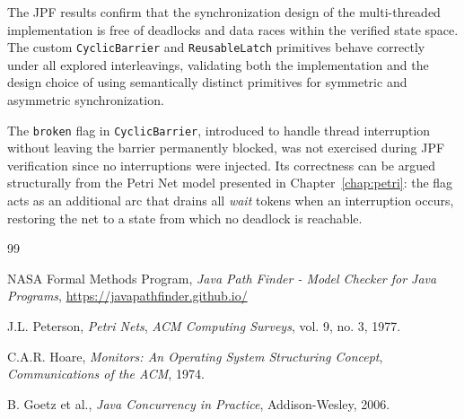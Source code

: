\documentclass[12pt,a4paper]{article}
\begin{document}
The JPF results confirm that the synchronization design of the
multi-threaded implementation is free of deadlocks and data races within
the verified state space. The custom \texttt{CyclicBarrier} and
\texttt{ReusableLatch} primitives behave correctly under all explored
interleavings, validating both the implementation and the design choice
of using semantically distinct primitives for symmetric and asymmetric
synchronization.
 
The \texttt{broken} flag in \texttt{CyclicBarrier}, introduced to handle
thread interruption without leaving the barrier permanently blocked, was
not exercised during JPF verification since no interruptions were injected.
Its correctness can be argued structurally from the Petri Net model
presented in Chapter~\ref{chap:petri}: the flag acts as an additional
arc that drains all \textit{wait} tokens when an interruption occurs,
restoring the net to a state from which no deadlock is reachable.

\begin{thebibliography}{99}

 NASA Formal Methods Program, \textit{Java Path Finder - Model Checker for Java Programs}, \url{https://javapathfinder.github.io/}

 J.L. Peterson, \textit{Petri Nets}, \textit{ACM Computing Surveys}, vol. 9, no. 3, 1977.

 C.A.R. Hoare, \textit{Monitors: An Operating System Structuring Concept}, \textit{Communications of the ACM}, 1974.

 B. Goetz et al., \textit{Java Concurrency in Practice}, Addison-Wesley, 2006.

\end{thebibliography}
\end{document}
